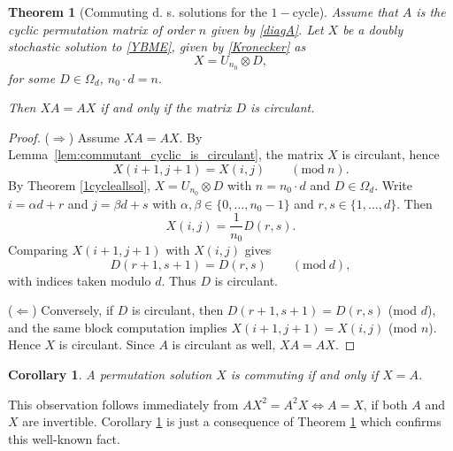 \documentclass{article}
\newtheorem{theorem}{Theorem}[section]
\newtheorem{corollary}{Corollary}[section]
\theoremstyle{definition}\newtheorem{example}{Example}[section]
\begin{document}
	\begin{theorem}[Commuting d. s. solutions for the $1-$cycle]\label{commuting_solutions_1cycle}
		Assume that $A$ is the cyclic permutation matrix of order $n$ given by \eqref{diagA}.
		Let $X$ be a doubly stochastic solution to \eqref{YBME}, given by \eqref{Kronecker} as 
		$$X=U_{n_0}\otimes D,$$
		for some $D\in\Omega_d$, $n_0\cdot d=n$. 
		
		Then $XA=AX$ if and only if
		the matrix $D$ is circulant.
	\end{theorem}
	
	\begin{proof}
		($\Rightarrow$)
		Assume $XA=AX$. By Lemma~\ref{lem:commutant_cyclic_is_circulant}, the matrix $X$ is circulant, hence
		\[
		X(i+1,j+1)=X(i,j)
		\qquad (\mathrm{mod}\ n).
		\]
		By Theorem \ref{1cycleallsol}, $X=U_{n_0}\otimes D$ with $n=n_0\cdot d$ and $D\in\Omega_d$.
		Write $i=\alpha d+r$ and $j=\beta d+s$ with $\alpha,\beta\in\{0,\dots,n_0-1\}$ and $r,s\in\{1,\dots,d\}$.
		Then
		\[
		X(i,j)=\frac1{n_0}D(r,s).
		\]
		Comparing $X(i+1,j+1)$ with $X(i,j)$ gives
		\[
		D(r+1,s+1)=D(r,s)
		\qquad (\mathrm{mod}\ d),
		\]
		with indices taken modulo $d$. Thus $D$ is circulant.
		
		($\Leftarrow$)
		Conversely, if $D$ is circulant, then $D(r+1,s+1)=D(r,s)$ (mod $d$), and the same block computation
		implies $X(i+1,j+1)=X(i,j)$ (mod $n$). Hence $X$ is circulant. Since $A$ is circulant as well, $XA=AX$.
	\end{proof}
	\begin{corollary}\label{trivA}
		A permutation solution $X$ is commuting if and only if $X=A$.
	\end{corollary}
	This observation follows immediately from $AX^2=A^2X\Leftrightarrow A=X$, if both $A$ and $X$ are invertible. Corollary \ref{trivA} is just a consequence of Theorem \ref{commuting_solutions_1cycle} which confirms this well-known fact.
	
\end{document}
